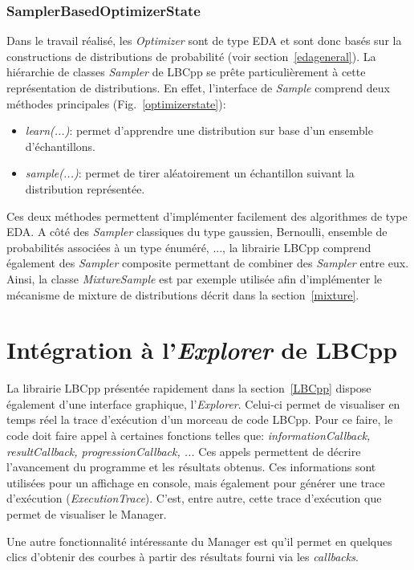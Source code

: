 \documentclass[a4paper, 11pt]{report}
\begin{document}
\subsubsection{SamplerBasedOptimizerState} 
Dans le travail réalisé, les \textit{Optimizer} sont de type EDA et sont donc basés sur la constructions de distributions de probabilité (voir section~\ref{edageneral}). La hiérarchie de classes \textit{Sampler} de LBCpp se prête particulièrement à cette représentation de distributions. En effet, l'interface de \textit{Sample} comprend deux méthodes principales (Fig.~\ref{optimizerstate}):
\begin{itemize}
\item \textit{learn(...)}: permet d'apprendre une distribution sur base d'un ensemble d'échantillons.
\item \textit{sample(...)}: permet de tirer aléatoirement un échantillon suivant la distribution représentée.
\end{itemize}
Ces deux méthodes permettent d'implémenter facilement des algorithmes de type EDA. A côté des \textit{Sampler} classiques du type gaussien, Bernoulli, ensemble de probabilités associées à un type énuméré, ..., la librairie LBCpp comprend également des \textit{Sampler} composite permettant de combiner des \textit{Sampler} entre eux. Ainsi, la classe \textit{MixtureSample} est par exemple utilisée afin d'implémenter le mécanisme de mixture de distributions décrit dans la section~\ref{mixture}.


\section{Intégration à l'\textit{Explorer} de LBCpp}
La librairie LBCpp présentée rapidement dans la section~\ref{LBCpp} dispose également d'une interface graphique, l'\textit{Explorer}. Celui-ci permet de visualiser en temps réel la trace d'exécution d'un morceau de code LBCpp. Pour ce faire, le code doit faire appel à certaines fonctions telles que: \textit{informationCallback, resultCallback, progressionCallback, ...} Ces appels permettent de décrire l'avancement du programme et les résultats obtenus. Ces informations sont utilisées pour un affichage en console, mais également pour générer une trace d'exécution (\textit{ExecutionTrace}). C'est, entre autre, cette trace d'exécution que permet de visualiser le Manager. 

Une autre fonctionnalité intéressante du Manager est qu'il permet en quelques clics d'obtenir des courbes à partir des résultats fourni via les \textit{callbacks}.
\end{document}
